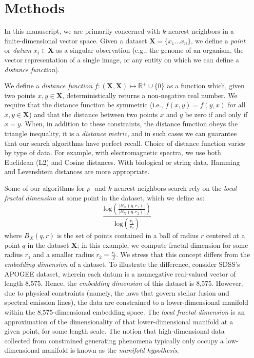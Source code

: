 \section{Methods}
\label{sec:methods}

In this manuscript, we are primarily concerned with $k$-nearest neighbors in a finite-dimensional 
vector space. Given a dataset $\textbf{X} = \{x_1 \dots x_n\}$, we define a \emph{point} or \emph{datum} $x_i \in \textbf{X}$ as a singular observation (e.g., the genome of 
an organism, the vector representation of a single image, or any entity on which we can define a \emph{distance function}).

We define a \emph{distance function} $f : (\textbf{X}, \textbf{X}) \mapsto \mathbb{R}^+ \cup \{0\}$ as a function which, 
given two points $x, y \in \textbf{X}$, deterministically returns a non-negative real number. We require that the distance function 
be symmetric (i.e., $f(x, y) = f(y, x)$ for all $x, y \in \textbf{X}$) and that the distance between two points $x$ and $y$ be zero if and only if $x = y$. 
When, in addition to these constraints, the distance function obeys
the triangle inequality, it is a \emph{distance metric}, and in such cases we can guarantee that our search algorithms have perfect recall. 
Choice of distance function varies by type of data. For example, with electromagnetic spectra, we use both 
Euclidean (L2) and Cosine distances. With biological or string data, Hamming and Levenshtein distances are more appropriate.


Some of our algorithms for $\rho$- and $k$-nearest neighbors search rely on the \emph{local fractal dimension} at some point in the dataset, 
which we define as: 
\begin{equation} \frac{\text{log}(\frac{|B_X(q, r_1)|}{|B_X(q, r_2)|})}{\text{log}(\frac{r_1}{r_2}) } \label{1} \end{equation}
where $B_X(q, r)$ is the set of points contained in a ball of radius $r$ 
centered at a point $q$ in the dataset $\textbf{X}$; in this example, we compute fractal dimension for some radius $r_1$ and a smaller radius $r_2 = \frac{r_1}{2}$.
We stress that this concept differs from the \emph{embedding dimension} of a dataset. To illustrate the difference,
consider SDSS's APOGEE dataset, wherein each datum is a nonnegative real-valued vector of length 8,575. Hence, the \emph{embedding dimension} of this dataset is 8,575. 
However, due to physical constraints (namely, the laws that govern stellar fusion and spectral emission lines), the data are constrained to a lower-dimensional 
manifold within the 8,575-dimensional embedding space. The \emph{local fractal dimension} is an approximation of the dimensionality of that lower-dimensional manifold at a given point, for some length scale.
The notion that high-dimensional data collected from constrained generating phenomena typically only occupy a low-dimensional manifold is known as the \emph{manifold hypothesis}.

